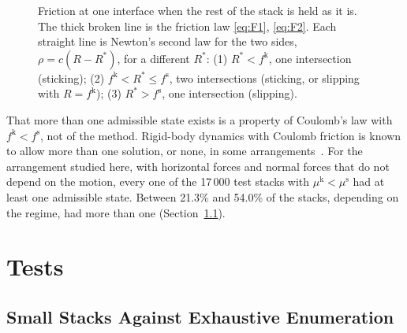 \documentclass[11pt,a4paper]{article}
\newcommand{\fs}{f^{\mathrm{s}}}
\newcommand{\fkin}{f^{\mathrm{k}}}
\newcommand{\mus}{\mu^{\mathrm{s}}}
\newcommand{\muk}{\mu^{\mathrm{k}}}
\begin{document}
\begin{figure}[ht]
\centering
{}
\caption{Friction at one interface when the rest of the stack is held as it is. The thick broken line is the friction law \eqref{eq:F1}, \eqref{eq:F2}. Each straight line is Newton's second law for the two sides, $\rho=c(R-R^{*})$, for a different $R^{*}$: (1) $R^{*}<\fkin$, one intersection (sticking); (2) $\fkin<R^{*}\le\fs$, two intersections (sticking, or slipping with $R=\fkin$); (3) $R^{*}>\fs$, one intersection (slipping).}\label{fig:law}
\end{figure}

That more than one admissible state exists is a property of Coulomb's law with $\fkin<\fs$, not of the method. Rigid-body dynamics with Coulomb friction is known to allow more than one solution, or none, in some arrangements~\cite{stewart}. For the arrangement studied here, with horizontal forces and normal forces that do not depend on the motion, every one of the 17\,000 test stacks with $\muk<\mus$ had at least one admissible state. Between 21.3\% and 54.0\% of the stacks, depending on the regime, had more than one (Section~\ref{sec:small}).

\section{Tests}\label{sec:tests}

\subsection{Small Stacks Against Exhaustive Enumeration}\label{sec:small}
\end{document}

